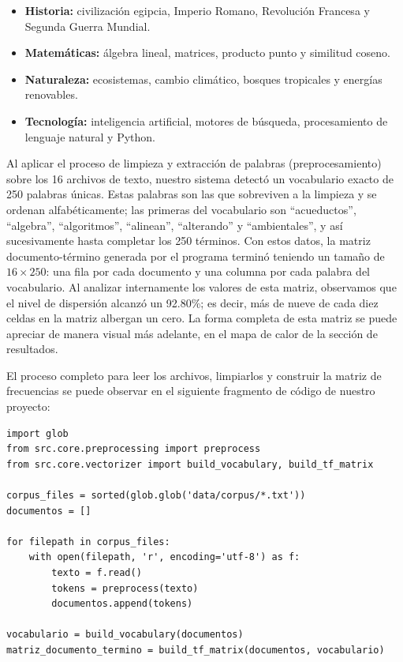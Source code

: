 \documentclass[12pt,a4paper]{article}
\begin{document}
\begin{itemize}
    \item \textbf{Historia:} civilización egipcia, Imperio Romano, Revolución Francesa y Segunda Guerra Mundial.
    \item \textbf{Matemáticas:} álgebra lineal, matrices, producto punto y similitud coseno.
    \item \textbf{Naturaleza:} ecosistemas, cambio climático, bosques tropicales y energías renovables.
    \item \textbf{Tecnología:} inteligencia artificial, motores de búsqueda, procesamiento de lenguaje natural y Python.
\end{itemize}

Al aplicar el proceso de limpieza y extracción de palabras (preprocesamiento) sobre los 16 archivos de texto, nuestro sistema detectó un vocabulario exacto de 250 palabras únicas. Estas palabras son las que sobreviven a la limpieza y se ordenan alfabéticamente; las primeras del vocabulario son ``acueductos'', ``algebra'', ``algoritmos'', ``alinean'', ``alterando'' y ``ambientales'', y así sucesivamente hasta completar los 250 términos. Con estos datos, la matriz documento-término generada por el programa terminó teniendo un tamaño de $16 \times 250$: una fila por cada documento y una columna por cada palabra del vocabulario. Al analizar internamente los valores de esta matriz, observamos que el nivel de dispersión alcanzó un 92.80\%; es decir, más de nueve de cada diez celdas en la matriz albergan un cero. La forma completa de esta matriz se puede apreciar de manera visual más adelante, en el mapa de calor de la sección de resultados.

El proceso completo para leer los archivos, limpiarlos y construir la matriz de frecuencias se puede observar en el siguiente fragmento de código de nuestro proyecto:

\begin{verbatim}
import glob
from src.core.preprocessing import preprocess
from src.core.vectorizer import build_vocabulary, build_tf_matrix

corpus_files = sorted(glob.glob('data/corpus/*.txt'))
documentos = []

for filepath in corpus_files:
    with open(filepath, 'r', encoding='utf-8') as f:
        texto = f.read()
        tokens = preprocess(texto)
        documentos.append(tokens)

vocabulario = build_vocabulary(documentos)
matriz_documento_termino = build_tf_matrix(documentos, vocabulario)
\end{verbatim}
\end{document}

